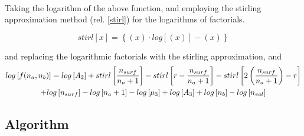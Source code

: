 \documentclass[10pt,letterpaper]{article}
\newcommand{\stirl}[1]{\ensuremath{\left\{\left(#1\right)\cdotp log\left[\left(#1\right)\right]-\left(#1\right)\right\}}}
\newcommand{\AlgoFuncMult}{
	\ensuremath{
		log
		\left[
		A_2
		\right]
		+
		stirl\left[
		\frac{
			n_{surf}
		}{
			n_a+1				
		}
		\right]
		-
		stirl\left[
		r-
		\frac{
			n_{surf}
		}{
			n_a+1				
		}
		\right]
		-
		stirl\left[
		2
		\left(
		\frac{
			n_{surf}
		}{
			n_a+1				
		}
		\right)	
		-
		r
		\right]\\
		+
		log
		\left[
		n_{surf}
		\right]
		-
		log
		\left[
		n_a+1
		\right]
		-
		log
		\left[
		\mu_{3}
		\right]
		+
		log
		\left[
		A_3
		\right]
		+
		log
		\left[
		n_{b}
		\right]
		-
		log
		\left[
		n_{vol}	
		\right]
	}
}
\begin{document}
\text{}\\
\noindent Taking the logarithm of the above function,
%
%
and employing the stirling approximation method (rel. \ref{stirl}) for the logarithms of factorials.

\begin{equation}
	stirl[x]=\stirl{x}
	\label{stirl}
\end{equation}

\noindent and replacing the logarithmic factorials with the stirling approximation, and 
%
%
%
\begin{multline}
	log
	\left[
	f(n_a,n_b)
	\right]
	=
	\AlgoFuncMult
	\label{logf}
\end{multline}

\newpage
\subsection{Algorithm}
\end{document}
